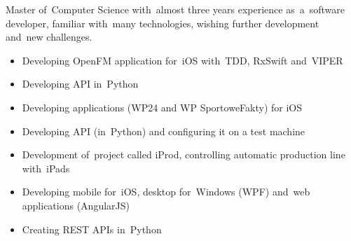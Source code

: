 \documentclass[11pt,a4paper]{article}
\begin{document}
    \bigskip


    \smallskip

    \noindent
    Master of~Computer Science with~almost three years experience as~a~software developer, familiar with~many
    technologies, wishing further development and~new challenges.


    \bigskip


    \smallskip

    \vspace{-0.2cm}
    \begin{itemize} \itemsep1pt \parskip0pt 
        \item Developing OpenFM application for~iOS with~TDD, RxSwift and~VIPER
        \item Developing API in~Python
    \end{itemize}
    \vspace{-0.2cm}
    \vspace{-0.2cm}
    \begin{itemize} \itemsep1pt \parskip0pt 
        \item Developing applications (WP24 and WP SportoweFakty) for iOS
        \item Developing API (in~Python) and configuring it on a test machine
    \end{itemize}
    \vspace{-0.2cm}
    \vspace{-0.2cm}
    \begin{itemize} \itemsep1pt \parskip0pt 
        \item Development of~project called iProd, controlling automatic production line with~iPads
        \item Developing mobile for~iOS, desktop for~Windows (WPF) and~web applications (AngularJS)
        \item Creating REST APIs in~Python
    \end{itemize}
\end{document}
